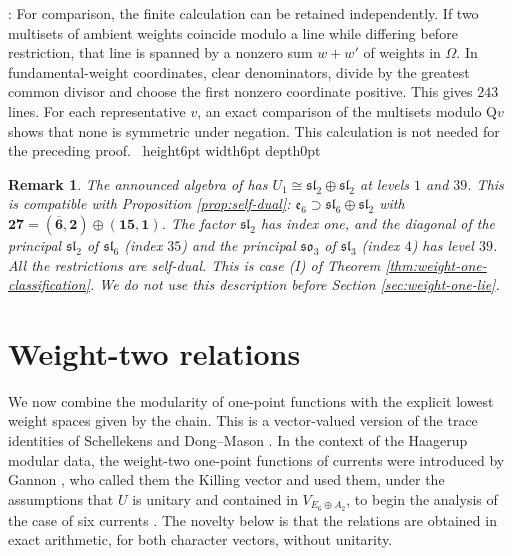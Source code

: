 \documentclass[leqno]{article}
\newcommand{\Q}{\mathrm{Q}}
\newcommand{\qed}{\hfill \vrule height6pt  width6pt depth0pt}
\newtheorem{remark}[thm]{Remark}
\newenvironment{proof}[1][]{\noindent {\it Proof #1} : }{\hbox{~}\qed
\smallskip
}
\numberwithin{equation}{section}
\begin{document}
\begin{proof}
For comparison, the finite calculation can be retained independently. If two multisets of ambient weights coincide modulo a line while differing before restriction, that line is spanned by a nonzero sum $w+w'$ of weights in $\Omega$. In fundamental-weight coordinates, clear denominators, divide by the greatest common divisor and choose the first nonzero coordinate positive. This gives $243$ lines. For each representative $v$, an exact comparison of the multisets modulo $\Q v$ shows that none is symmetric under negation. This calculation is not needed for the preceding proof.
\end{proof}

\begin{remark}\normalfont
\label{rem:announced-fits}
The announced algebra of \cite{Rie26,Hua26} has $U_1 \cong \mathfrak{sl}_2 \oplus \mathfrak{sl}_2$ at levels $1$ and $39$. This is compatible with Proposition \ref{prop:self-dual}: $\mathfrak e_6 \supset \mathfrak{sl}_6 \oplus \mathfrak{sl}_2$ with $\mathbf{27} = (\overline{\mathbf 6},\mathbf 2) \oplus (\mathbf{15},\mathbf 1)$. The factor $\mathfrak{sl}_2$ has index one, and the diagonal of the principal $\mathfrak{sl}_2$ of $\mathfrak{sl}_6$ (index $35$) and the principal $\mathfrak{so}_3$ of $\mathfrak{sl}_3$ (index $4$) has level $39$. All the restrictions are self-dual. This is case (I) of Theorem \ref{thm:weight-one-classification}. We do not use this description before Section \ref{sec:weight-one-lie}.
\end{remark}

\section{Weight-two relations}
\label{sec:weight-two}

We now combine the modularity of one-point functions with the explicit lowest weight spaces given by the chain. This is a vector-valued version of the trace identities of Schellekens \cite{Sch93} and Dong--Mason \cite{DoM04b}. In the context of the Haagerup modular data, the weight-two one-point functions of currents were introduced by Gannon \cite[Section 2.4]{Gan19}, who called them the Killing vector and used them, under the assumptions that $U$ is unitary and contained in $V_{E_6 \oplus A_2}$, to begin the analysis of the case of six currents \cite[Section 3.3]{Gan19}. The novelty below is that the relations are obtained in exact arithmetic, for both character vectors, without unitarity.
\end{document}
